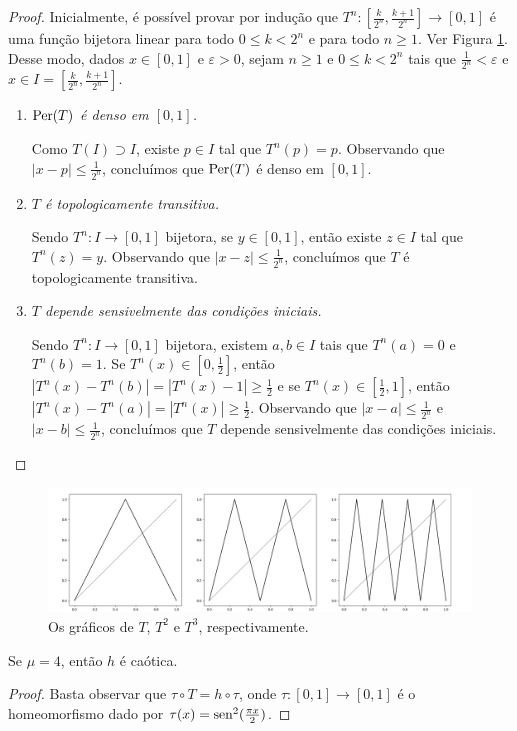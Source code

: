 \begin{proof}
Inicialmente, é possível provar por indução que $T^n: [\frac{k}{2^n}, \frac{k+1}{2^n}] \to [0,1]$ é uma função bijetora linear para todo $0 \leq k  < 2^n$ e para todo $n \geq 1$.
Ver Figura \ref{fig tent-map}.
Desse modo, dados $x \in [0, 1]$ e $\varepsilon > 0$, sejam $n \geq 1$ e $0 \leq k < 2^n$ tais que $\frac{1}{2^n} < \varepsilon$ e $x \in I = \left[\frac{k}{2^n}, \frac{k+1}{2^n}\right]$.

\begin{enumerate}[label=\alph*)]
\item \textit{$\operatorname{Per}(T)$ é denso em $[0, 1]$.}

Como $T(I) \supset I$, existe $p \in I$ tal que $T^n(p) = p$. Observando que $|x-p| \leq \frac{1}{2^n}$, concluímos que $\operatorname{Per}(T)$ é denso em $[0, 1]$.

\item \textit{$T$ é topologicamente transitiva.}

Sendo $T^n: I \to [0,1]$ bijetora, se $y \in [0, 1]$, então existe $z \in I$ tal que $T^n(z) = y$.
Observando que $|x - z| \leq \frac{1}{2^n}$, concluímos que $T$ é topologicamente transitiva.

\item \textit{$T$ depende sensivelmente das condições iniciais.}

Sendo $T^n: I \to [0,1]$ bijetora, existem $a, b \in I$ tais que $T^n(a) = 0$ e $T^n(b) = 1$. Se $T^n(x) \in [0, \frac{1}{2}]$, então $|T^n(x) - T^n(b)| = |T^n(x) - 1| \geq \frac{1}{2}$ e se $T^n(x) \in [\frac{1}{2}, 1]$, então $|T^n(x) - T^n(a)| = |T^n(x)| \geq \frac{1}{2}$. Observando que $|x - a| \leq \frac{1}{2^n}$ e $|x - b| \leq \frac{1}{2^n}$, concluímos que $T$ depende sensivelmente das condições iniciais.
\end{enumerate}
\end{proof}

\begin{figure}[!htb]
\centering
\includegraphics[scale=0.3]{images/tent-map.png}
\caption{Os gráficos de $T$, $T^2$ e $T^3$, respectivamente.}
\label{fig tent-map}
\end{figure}

\begin{theorem}
Se $\mu = 4$, então $h$ é caótica.
\end{theorem}

\begin{proof}
Basta observar que $\tau \circ T = h \circ \tau$, onde $\tau: [0, 1] \to [0, 1]$ é o homeomorfismo dado por $\tau(x) = \operatorname{sen}^2(\frac{\pi x}{2})$.
\end{proof}
